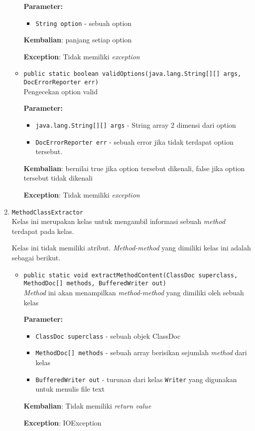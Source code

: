 \documentclass{article}
\begin{document}
\begin{enumerate}
\begin{itemize}
\textbf{Parameter:}
\begin{itemize}
\item \texttt{String option} - 
sebuah option
\end{itemize}
\textbf{Kembalian}: panjang setiap option

\textbf{Exception}: Tidak memiliki \textit{exception}

\item \texttt{public static boolean validOptions(java.lang.String[][] args, DocErrorReporter err)}\\ 
Pengecekan option valid

\textbf{Parameter:}
\begin{itemize}
\item \texttt{java.lang.String[][] args} - 
String array 2 dimensi dari option
\item \texttt{DocErrorReporter err} - 
sebuah error jika tidak terdapat option tersebut.
\end{itemize}
\textbf{Kembalian}: bernilai true jika option tersebut dikenali, false jika option tersebut tidak dikenali

\textbf{Exception}: Tidak memiliki \textit{exception}

\end{itemize}
\item \texttt{MethodClassExtractor}\\ 
Kelas ini merupakan kelas untuk mengambil informasi sebuah \textit{method}
 terdapat pada kelas.

Kelas ini tidak memiliki atribut. \textit{Method-method} yang dimiliki kelas ini adalah sebagai berikut.
\begin{itemize}
\item \texttt{public static void extractMethodContent(ClassDoc superclass, MethodDoc[] methods, BufferedWriter out)}\\ 
\textit{Method} ini akan menampilkan \textit{method-method} yang dimiliki oleh
 sebuah kelas

\textbf{Parameter:}
\begin{itemize}
\item \texttt{ClassDoc superclass} - 
sebuah objek ClassDoc
\item \texttt{MethodDoc[] methods} - 
sebuah array berisikan sejumlah \textit{method} dari kelas
\item \texttt{BufferedWriter out} - 
turunan dari kelas \texttt{Writer} yang digunakan untuk menulis
 file text
\end{itemize}
\textbf{Kembalian}: Tidak memiliki \textit{return value}

\textbf{Exception}: IOException

\end{itemize}
\end{enumerate}
\end{document}
